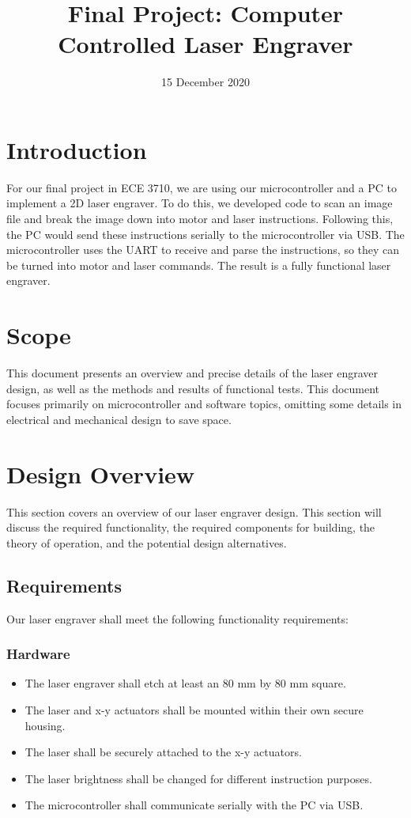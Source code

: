 \documentclass[11pt]{LaTeX-Classes/math-hw}
\title{Final Project: Computer Controlled Laser Engraver}
\date{15 December 2020}
\begin{document}
\maketitle

\section{Introduction}
For our final project in ECE 3710, we are using our microcontroller and a PC to implement a 2D laser engraver. To do this, we developed code to scan an image file and break the image down into motor and laser instructions. Following this, the PC would send these instructions serially to the microcontroller via USB. The microcontroller uses the UART to receive and parse the instructions, so they can be turned into motor and laser commands. The result is a fully functional laser engraver.

\section{Scope}
This document presents an overview and precise details of the laser engraver design,
as well as the methods and results of functional tests.
This document focuses primarily on microcontroller and software topics,
omitting some details in electrical and mechanical design to save space.

\section{Design Overview}
This section covers an overview of our laser engraver design. This section will discuss the required functionality, the required components for building, the theory of operation, and the potential design alternatives. 
\subsection{Requirements}
Our laser engraver shall meet the following functionality requirements:
\subsubsection*{Hardware}
	\begin{itemize}
		\item The laser engraver shall etch at least an 80 mm by 80 mm square.
		\item The laser and x-y actuators shall be mounted within their own secure housing.
		\item The laser shall be securely attached to the x-y actuators.
		\item The laser brightness shall be changed for different instruction purposes.
		\item The microcontroller shall communicate serially with the PC via USB.
	\end{itemize}
\end{document}
